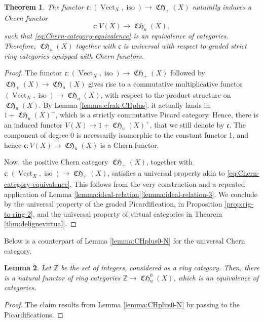\documentclass[11pt]{article}
\theoremstyle{plain}
\newtheorem{theorem}{Theorem}[section]
\newtheorem{lemma}[theorem]{Lemma}
\theoremstyle{definition}
\newcommand{\ZBbb}{\mathbb Z}
\newcommand{\cfrak}{\mathfrak c}
\DeclareMathOperator{\CHfrak}{\mathfrak{CH}}
\DeclareMathOperator{\iso}{iso}
\DeclareMathOperator{\Vect}{Vect}
\begin{document}
\begin{theorem}\label{thm:CH-is-universal}
The functor $\cfrak\colon (\Vect_{X},\iso)\to \CHfrak_{+}(X)$ naturally induces a Chern functor
\begin{displaymath}
\cfrak\colon V(X)\to\CHfrak_{u}(X),
\end{displaymath} such that \eqref{eq:Chern-category-equivalence} is an equivalence of categories. Therefore, $\CHfrak_{u}(X)$ together with $\cfrak$ is universal with respect to graded strict ring categories equipped with Chern functors.
\end{theorem}
\begin{proof}
The functor $\cfrak\colon (\Vect_{X},\iso)\to \CHfrak_{+}(X)$ followed by $\CHfrak_{+}(X)\to\CHfrak_{u}(X)$ gives rise to a commutative multiplicative functor $ (\Vect_{X},\iso)\to \CHfrak_{u}(X)$, with respect to the product structure on $\CHfrak_{u}(X)$. By Lemma \ref{lemma:cfrak-CHplus}, it actually lands in $1+\CHfrak_{u}(X)^{+}$, which is a strictly commutative Picard category. Hence, there is an induced functor $V(X)\to 1+\CHfrak_{u}(X)^{+}$, that we still denote by $\cfrak$. The component of degree 0 is necessarily isomorphic to the constant functor 1, and hence $\cfrak\colon V(X)\to\CHfrak_{u}(X)$ is a Chern functor.

Now, the positive Chern category $\CHfrak_{+}(X)$, together with \hbox{$\cfrak\colon\! (\Vect_{X},\iso)\!\to\!\CHfrak_{+}(X)$}, satisfies a universal property akin to \eqref{eq:Chern-category-equivalence}. This follows from the very construction and a repeated application of Lemma \ref{lemma:ideal-relation}\eqref{lemma:ideal-relation-3}. We conclude by the universal property of the graded Picardification, in Proposition \ref{prop:rig-to-ring-2}, and the universal property of virtual categories in Theorem \ref{thm:delignevirtual}.
\end{proof}

Below is a counterpart of Lemma \ref{lemma:CHplus0-N} for the universal Chern category.
\begin{lemma}\label{lemma:CHu0-Z}
Let $\ZBbb$ be the set of integers, considered as a ring category. Then, there is a natural functor of ring categories $\ZBbb\to\CHfrak_{u}^{0}(X)$, which is an equivalence of categories.
\end{lemma}
\begin{proof}
The claim results from Lemma \ref{lemma:CHplus0-N} by passing to the Picardifications.
\end{proof}
\end{document}
